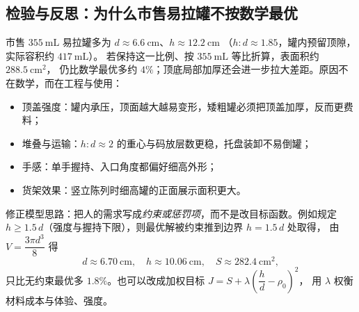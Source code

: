 \subsection{检验与反思：为什么市售易拉罐不按数学最优}
市售 $355\ \mathrm{mL}$ 易拉罐多为 $d\approx6.6\ \mathrm{cm}$、$h\approx12.2\ \mathrm{cm}$
（$h:d\approx1.85$，罐内预留顶隙，实际容积约 $417\ \mathrm{mL}$）。
若保持这一比例、按 $355\ \mathrm{mL}$ 等比折算，表面积约 $288.5\ \mathrm{cm^2}$，
仍比数学最优多约 $4\%$；顶底局部加厚还会进一步拉大差距。原因不在数学，而在工程与使用：
\begin{itemize}
  \item 顶盖强度：罐内承压，顶面越大越易变形，矮粗罐必须把顶盖加厚，反而更费料；
  \item 堆叠与运输：$h:d\approx2$ 的重心与码放层数更稳，托盘装卸不易倒罐；
  \item 手感：单手握持、入口角度都偏好细高外形；
  \item 货架效果：竖立陈列时细高罐的正面展示面积更大。
\end{itemize}
修正模型思路：把人的需求写成\emph{约束或惩罚项}，而不是改目标函数。例如规定
$h\ge 1.5\,d$（强度与握持下限），则最优解被约束推到边界 $h=1.5\,d$ 处取得，
由 $V=\dfrac{3\pi d^3}{8}$ 得
\[
  d\approx 6.70\ \mathrm{cm},\quad h\approx 10.06\ \mathrm{cm},\quad S\approx 282.4\ \mathrm{cm^2},
\]
只比无约束最优多 $1.8\%$。也可以改成加权目标 $J=S+\lambda\left(\dfrac hd-\rho_0\right)^2$，
用 $\lambda$ 权衡材料成本与体验、强度。
